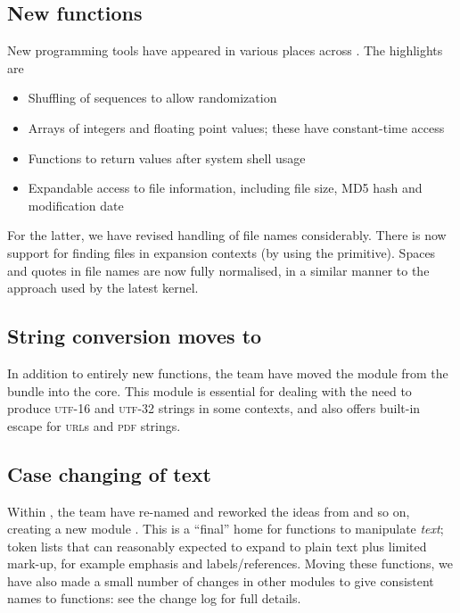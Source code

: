 \documentclass{ltnews}
\begin{document}
\subsection{New functions}

New programming tools have appeared in various places across .
The highlights are
\begin{itemize}
  \item Shuffling of sequences to allow randomization
  \item Arrays of integers and floating point values; these have constant-time
    access
  \item Functions to return values after system shell usage
  \item Expandable access to file information, including file size, MD5
    hash and modification date
\end{itemize}

For the latter, we have revised handling of file names considerably. There is
now support for finding files in expansion contexts (by using the
 primitive). Spaces and quotes in file names are now fully
normalised, in a similar manner to the approach used by the latest \LaTeXe{}
kernel.

\subsection{String conversion moves to }

In addition to entirely new functions, the team have moved the
 module from the  bundle into the
 core. This module is essential for dealing with the need to produce
\textsc{utf}-16 and \textsc{utf}-32 strings in some contexts, and also offers
built-in escape for \textsc{url}s and \textsc{pdf} strings.

\subsection{Case changing of text}

Within , the team have re-named and reworked the ideas from
 and so on, creating a new module . This is a
\enquote{final} home for functions to manipulate \emph{text}; token lists that
can reasonably expected to expand to plain text plus limited mark-up, for
example emphasis and labels/references. Moving these functions, we have also
made a small number of changes in other modules to give consistent names to
functions: see the change log for full details.
\end{document}
